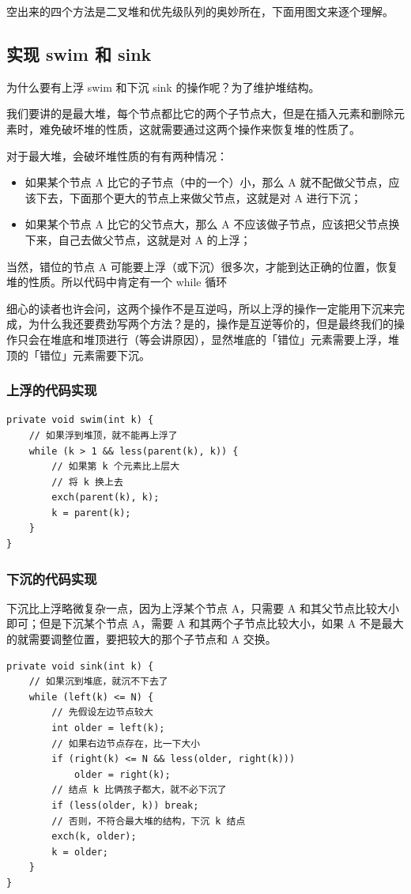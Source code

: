 \documentclass[12pt]{article}
\begin{document}
空出来的四个方法是二叉堆和优先级队列的奥妙所在，下面用图文来逐个理解。

\subsection{实现 swim 和 sink}
为什么要有上浮 swim 和下沉 sink 的操作呢？为了维护堆结构。

我们要讲的是最大堆，每个节点都比它的两个子节点大，但是在插入元素和删除元素时，难免破坏堆的性质，这就需要通过这两个操作来恢复堆的性质了。

对于最大堆，会破坏堆性质的有有两种情况：
\begin{itemize}
\setlength{\itemsep}{0pt}
\setlength{\parsep}{0pt}
\setlength{\parskip}{0pt}
    \item 如果某个节点 A 比它的子节点（中的一个）小，那么 A 就不配做父节点，应该下去，下面那个更大的节点上来做父节点，这就是对 A 进行下沉；
    \item 如果某个节点 A 比它的父节点大，那么 A 不应该做子节点，应该把父节点换下来，自己去做父节点，这就是对 A 的上浮；
\end{itemize}

当然，错位的节点 A 可能要上浮（或下沉）很多次，才能到达正确的位置，恢复堆的性质。所以代码中肯定有一个 while 循环

细心的读者也许会问，这两个操作不是互逆吗，所以上浮的操作一定能用下沉来完成，为什么我还要费劲写两个方法？是的，操作是互逆等价的，但是最终我们的操作只会在堆底和堆顶进行（等会讲原因），显然堆底的「错位」元素需要上浮，堆顶的「错位」元素需要下沉。

\subsubsection{上浮的代码实现}
\begin{lstlisting}
private void swim(int k) {
    // 如果浮到堆顶，就不能再上浮了
    while (k > 1 && less(parent(k), k)) {
        // 如果第 k 个元素比上层大
        // 将 k 换上去
        exch(parent(k), k);
        k = parent(k);
    }
}
\end{lstlisting}

\subsubsection{下沉的代码实现}
下沉比上浮略微复杂一点，因为上浮某个节点 A，只需要 A 和其父节点比较大小即可；但是下沉某个节点 A，需要 A 和其两个子节点比较大小，如果 A 不是最大的就需要调整位置，要把较大的那个子节点和 A 交换。
\begin{lstlisting}
private void sink(int k) {
    // 如果沉到堆底，就沉不下去了
    while (left(k) <= N) {
        // 先假设左边节点较大
        int older = left(k);
        // 如果右边节点存在，比一下大小
        if (right(k) <= N && less(older, right(k)))
            older = right(k);
        // 结点 k 比俩孩子都大，就不必下沉了
        if (less(older, k)) break;
        // 否则，不符合最大堆的结构，下沉 k 结点
        exch(k, older);
        k = older;
    }
}
\end{lstlisting}
\end{document}

